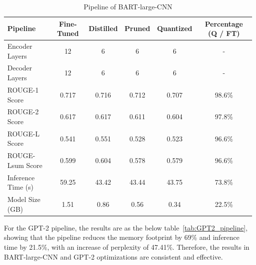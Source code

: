 \documentclass{article}
\begin{document}
    \begin{table}[h!]
        \centering
        \begin{tabular}{lccccc}
            \toprule
            \textbf{Pipeline}       & \textbf{Fine-Tuned} & \textbf{Distilled} & \textbf{Pruned} & \textbf{Quantized}  & \textbf{Percentage (Q / FT)} \\ \midrule
            Encoder Layers        & 12                  & 6                     & 6                & 6  &  -                    \\
            Decoder Layers        & 12                  & 6                     & 6                & 6  &  -                    \\
            ROUGE-1 Score         & 0.717               & 0.716                 & 0.712            & 0.707  &  98.6\%                 \\
            ROUGE-2 Score         & 0.617               & 0.617                 & 0.611            & 0.604  &  97.8\%                \\
            ROUGE-L Score         & 0.541               & 0.551                 & 0.528            & 0.523  &  96.6\%                 \\
            ROUGE-Lsum Score      & 0.599               & 0.604                 & 0.578            & 0.579  &  96.6\%                 \\
            Inference Time (s)    & 59.25               & 43.42                 & 43.44             & 43.75  &  73.8\%                  \\
            Model Size (GB)       & 1.51                & 0.86                  & 0.56             & 0.34   &  22.5\%                  \\ \bottomrule
        \end{tabular}
        \caption{Pipeline of BART-large-CNN}
        \label{tab:BART_pipeline}
    \end{table}

    \hspace*{1em} For the GPT-2 pipeline, the results are as the below table~\ref{tab:GPT2_pipeline}, showing that the pipeline reduces the memory footprint by 69\% and inference time by 21.5\%, with an increase of perplexity of 47.41\%. Therefore, the results in BART-large-CNN and GPT-2 optimizations are consistent and effective.
\end{document}
